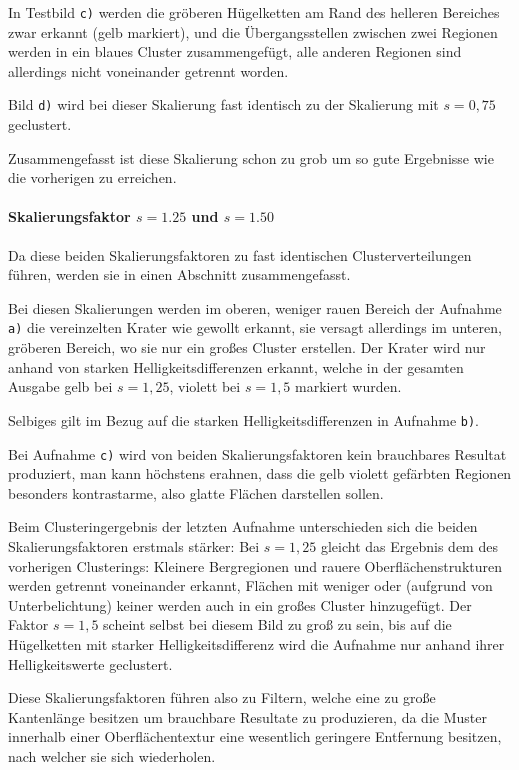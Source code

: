 In Testbild \texttt{c)} werden die gröberen Hügelketten am Rand des helleren Bereiches zwar erkannt (gelb markiert), und die Übergangsstellen zwischen zwei Regionen werden in ein blaues Cluster zusammengefügt, alle anderen Regionen sind allerdings nicht voneinander getrennt worden.

Bild \texttt{d)} wird bei dieser Skalierung fast identisch zu der Skalierung mit $s=0,75$ geclustert.

Zusammengefasst ist diese Skalierung schon zu grob um so gute Ergebnisse wie die vorherigen zu erreichen.

\paragraph{Skalierungsfaktor $s=1.25$ und $s=1.50$}

Da diese beiden Skalierungsfaktoren zu fast identischen Clusterverteilungen führen, werden sie in einen Abschnitt zusammengefasst.

Bei diesen Skalierungen werden im oberen, weniger rauen Bereich der Aufnahme \texttt{a)} die vereinzelten Krater wie gewollt erkannt, sie versagt allerdings im unteren, gröberen Bereich, wo sie nur ein großes Cluster erstellen. Der Krater wird nur anhand von starken Helligkeitsdifferenzen erkannt, welche in der gesamten Ausgabe gelb bei $s=1,25$, \bzw violett bei $s=1,5$ markiert wurden. 

Selbiges gilt im Bezug auf die starken Helligkeitsdifferenzen in Aufnahme \texttt{b)}.

Bei Aufnahme \texttt{c)} wird von beiden Skalierungsfaktoren kein brauchbares Resultat produziert, man kann höchstens erahnen, dass die gelb \bzw violett gefärbten Regionen besonders kontrastarme, also glatte Flächen darstellen sollen.

Beim Clusteringergebnis der letzten Aufnahme unterschieden sich die beiden Skalierungsfaktoren erstmals stärker: Bei $s=1,25$ gleicht das Ergebnis dem des vorherigen Clusterings: Kleinere Bergregionen und rauere Oberflächenstrukturen werden getrennt voneinander erkannt, Flächen mit weniger oder (aufgrund von Unterbelichtung) keiner werden auch in ein großes Cluster hinzugefügt. Der Faktor $s=1,5$ scheint selbst bei diesem Bild zu groß zu sein, bis auf die Hügelketten mit starker Helligkeitsdifferenz wird die Aufnahme nur anhand ihrer Helligkeitswerte geclustert.

Diese Skalierungsfaktoren führen also zu Filtern, welche eine zu große Kantenlänge besitzen um brauchbare Resultate zu produzieren, da die Muster innerhalb einer Oberflächentextur eine wesentlich geringere Entfernung besitzen, nach welcher sie sich wiederholen.

